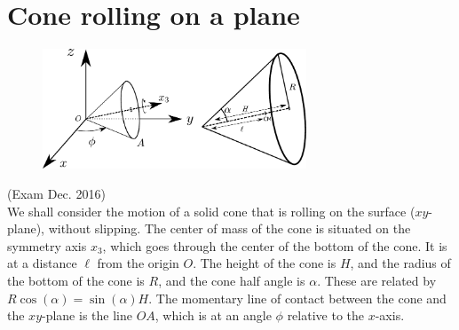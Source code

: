 \documentclass{article}
\begin{document}
    \section{Cone rolling on a plane}
        \begin{figure}
            \centering
            \includegraphics[width=0.7\textwidth]{figures/exercise_7_3_cone.pdf}
        \end{figure} 
        (Exam Dec. 2016) \\
        We shall consider the motion of a solid cone that is rolling on the surface ($xy$-plane), without slipping. The center of mass of the cone is situated on the symmetry axis $x_3$, which goes through the center of the bottom of the cone. It is at a distance $\ell$ from the origin $O$. The height of the cone is $H$, and the radius of the bottom of the cone is $R$, and the cone half angle is $\alpha$. These are related by $R\cos(\alpha) = \sin(\alpha)  H$. The momentary line of contact between the cone and the $xy$-plane is the line $OA$, which is at an angle $\phi$ relative to the $x$-axis.
\end{document}
